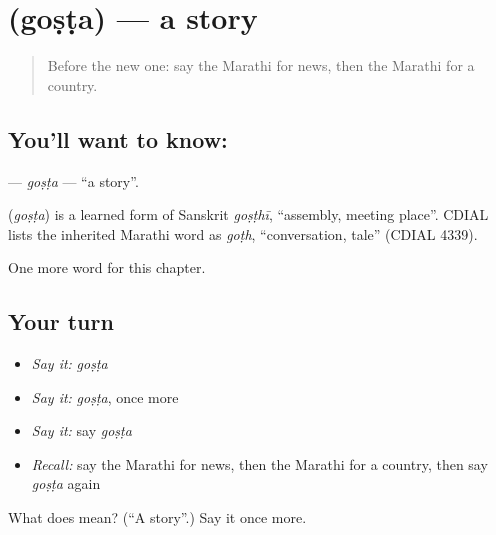\section[\texorpdfstring{\mr{गोष्ट} (goṣṭa)}{गोष्ट (goṣṭa)}]{ (goṣṭa) — a story}

\label{lesson:MR-C120-gosta}



\begin{quote}
Before the new one: say the Marathi for news, then the Marathi for a country.
\end{quote}

\subsection*{You'll want to know: }
\textbf{} — \emph{goṣṭa} — \textquotedblleft{}a story\textquotedblright{}.

\begin{cousinweb}
\textbf{} (\emph{goṣṭa}) is a learned form of Sanskrit \emph{goṣṭhī}, \textquotedblleft{}assembly, meeting place\textquotedblright{}. CDIAL lists the inherited Marathi word as \emph{goṭh}, \textquotedblleft{}conversation, tale\textquotedblright{} (CDIAL 4339).
\end{cousinweb}

\begin{grammarlens}[title={What you've built}]
One more word for this chapter.
\end{grammarlens}

\subsection*{Your turn}
\begin{itemize}
\raggedright
  \item \emph{Say it:} \emph{goṣṭa}
  \item \emph{Say it:} \emph{goṣṭa}, once more
  \item \emph{Say it:} say \emph{goṣṭa}
  \item \emph{Recall:} say the Marathi for news, then the Marathi for a country, then say \emph{goṣṭa} again
\end{itemize}

\begin{tcolorbox}[breakable,colback=teal!4,colframe=teal!35!black,title={Before you move on}]
What does  mean? (\textquotedblleft{}A story\textquotedblright{}.) Say it once more.
\end{tcolorbox}
